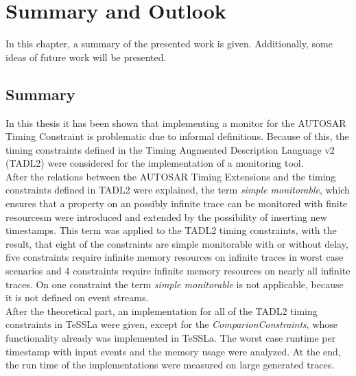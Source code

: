 
\chapter{Summary and Outlook}
\label{chapter-fazit}

In this chapter, a summary of the presented work is given. Additionally, some ideas of future work will be presented.
\section{Summary}
	In this thesis it has been shown that implementing a monitor for the AUTOSAR Timing Constraint is problematic due to informal definitions. Because of this, the timing constraints defined in the Timing Augmented Description Language v2 (TADL2) were considered for the implementation of a monitoring tool.\\
	After the relations between the AUTOSAR Timing Extensions and the timing constraints defined in TADL2 were explained, the term \textit{simple monitorable}, which ensures that a property on an possibly infinite trace can be monitored with finite resourcesm were introduced and extended by the possibility of inserting new timestamps. This term was applied to the TADL2 timing constraints, with the result, that eight of the constraints are simple monitorable with or without delay, five constraints require infinite memory resources on infinite traces in worst case scenarios and 4 constraints require infinite memory resources on nearly all infinite traces. On one constraint the term \textit{simple monitorable} is not applicable, because it is not defined on event streams.\\
	After the theoretical part, an implementation for all of the TADL2 timing constraints in TeSSLa were given, except for the \textit{ComparionConstraints}, whose functionality already was implemented in TeSSLa. The worst case runtime per timestamp with input events and the memory usage were analyzed. At the end, the run time of the implementations were measured on large generated traces.
